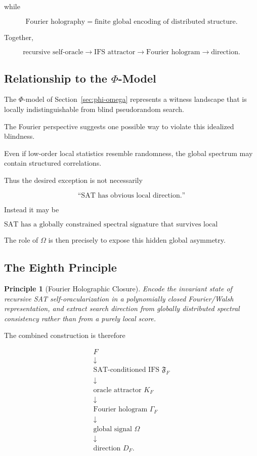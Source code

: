 \documentclass[11pt]{article}
\theoremstyle{plain}
\newtheorem{principle}[theorem]{Principle}
\theoremstyle{definition}
\begin{document}
while

\[
\boxed{
\text{Fourier holography}
=
\text{finite global encoding of distributed structure}.
}
\]

Together,

\[
\boxed{
\text{recursive self-oracle}
\to
\text{IFS attractor}
\to
\text{Fourier hologram}
\to
\text{direction}.
}
\]

\subsection{Relationship to the \(\Phi\)-Model}

The \(\Phi\)-model of Section~\ref{sec:phi-omega} represents a witness
landscape that is locally indistinguishable from blind pseudorandom search.

The Fourier perspective suggests one possible way to violate this idealized
blindness.

Even if low-order local statistics resemble randomness, the global spectrum
may contain structured correlations.

Thus the desired exception is not necessarily

\[
    \text{``SAT has obvious local direction.''}
\]

Instead it may be

\[
\boxed{
\text{SAT has a globally constrained spectral signature that survives local
pseudorandomness.}
}
\]

The role of \(\Omega\) is then precisely to expose this hidden global
asymmetry.

\subsection{The Eighth Principle}

\begin{principle}[Fourier Holographic Closure]
\label{principle:fourier-holographic-closure}
Encode the invariant state of recursive SAT self-oracularization in a
polynomially closed Fourier/Walsh representation, and extract search direction
from globally distributed spectral consistency rather than from a purely
local score.
\end{principle}

The combined construction is therefore

\[
\boxed{
\begin{array}{c}
F
\\[2pt]
\downarrow
\\[2pt]
\text{SAT-conditioned IFS }\mathfrak{F}_F
\\[2pt]
\downarrow
\\[2pt]
\text{oracle attractor }K_F
\\[2pt]
\downarrow
\\[2pt]
\text{Fourier hologram }\Gamma_F
\\[2pt]
\downarrow
\\[2pt]
\text{global signal }\Omega
\\[2pt]
\downarrow
\\[2pt]
\text{direction }D_F.
\end{array}
}
\]
\end{document}
